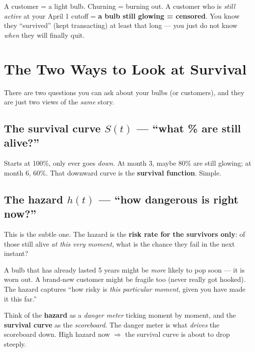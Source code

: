 \documentclass[11pt]{article}
\begin{document}
\begin{churnbox}
A customer = a light bulb. Churning = burning out. A customer who is \emph{still active} at your
April 1 cutoff = \textbf{a bulb still glowing = censored}. You know they ``survived'' (kept
transacting) at least that long --- you just do not know \emph{when} they will finally quit.
\end{churnbox}

\section{The Two Ways to Look at Survival}

There are two questions you can ask about your bulbs (or customers), and they are just two views of
the \emph{same} story.

\subsection{The survival curve $S(t)$ --- ``what \% are still alive?''}
Starts at 100\%, only ever goes \emph{down}. At month 3, maybe 80\% are still glowing; at month 6,
60\%. That downward curve is the \textbf{survival function}. Simple.

\subsection{The hazard $h(t)$ --- ``how dangerous is right now?''}
This is the subtle one. The hazard is the \textbf{risk rate for the survivors only}: of those still
alive \emph{at this very moment}, what is the chance they fail in the next instant?

A bulb that has already lasted 5 years might be \emph{more} likely to pop soon --- it is worn out.
A brand-new customer might be fragile too (never really got hooked). The hazard captures ``how risky
is \emph{this particular moment}, given you have made it this far.''

\begin{plainbox}
Think of the \textbf{hazard} as a \emph{danger meter} ticking moment by moment, and the
\textbf{survival curve} as the \emph{scoreboard}. The danger meter is what \emph{drives} the
scoreboard down. High hazard now $\Rightarrow$ the survival curve is about to drop steeply.
\end{plainbox}
\end{document}
